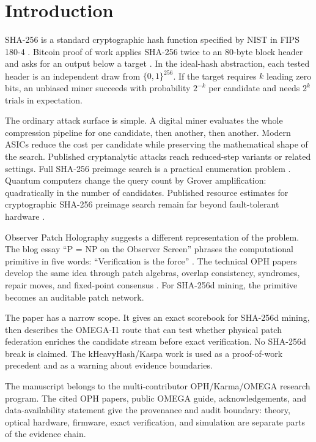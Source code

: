 \documentclass[11pt]{article}
\theoremstyle{definition}
\theoremstyle{remark}
\newcommand{\bits}{\{0,1\}}
\begin{document}
\section{Introduction}

SHA-256 is a standard cryptographic hash function specified by NIST in FIPS
180-4 \cite{NISTFIPS1804}. Bitcoin proof of work applies SHA-256 twice to an
80-byte block header and asks for an output below a target \cite{Nakamoto2008}.
In the ideal-hash abstraction, each tested header is an independent draw from
\(\bits^{256}\). If the target requires \(k\) leading zero bits, an unbiased
miner succeeds with probability \(2^{-k}\) per candidate and needs \(2^k\)
trials in expectation.

The ordinary attack surface is simple. A digital miner evaluates the whole
compression pipeline for one candidate, then another, then another. Modern
ASICs reduce the cost per candidate while preserving the mathematical shape of
the search. Published cryptanalytic attacks reach reduced-step variants or related
settings. Full SHA-256 preimage search is a practical enumeration problem
\cite{MendelNadSchlaeffer2013,KhovratovichRechbergerSavelieva2011,AlamgirNejatiBright2024}.
Quantum computers change the query count by Grover amplification: quadratically
in the number of candidates. Published resource estimates for
cryptographic SHA-256 preimage search remain far beyond fault-tolerant
hardware \cite{Grover1997,Zalka1999,AmyEtAl2016,NeremGaur2023}.

Observer Patch Holography suggests a different representation of the problem.
The blog essay ``P = NP on the Observer Screen'' phrases the computational
primitive in five words: ``Verification is the force'' \cite{OPHBlogPNP}. The
technical OPH papers develop the same idea through patch algebras, overlap
consistency, syndromes, repair moves, and fixed-point consensus
\cite{OPHObserversCurrent,OPHCompactCurrent,OPHConsensusCurrent,OPHScreenCurrent}. For SHA-256d mining, the
primitive becomes an auditable patch network.

The paper has a narrow scope. It gives an exact scorebook for SHA-256d mining,
then describes the OMEGA-I1 route that can test whether physical patch
federation enriches the candidate stream before exact verification. No SHA-256d
break is claimed. The kHeavyHash/Kaspa work is used as a proof-of-work
precedent and as a warning about evidence boundaries.

The manuscript belongs to the multi-contributor OPH/Karma/OMEGA research
program. The cited OPH papers, public OMEGA guide, acknowledgements, and
data-availability statement give the provenance and audit boundary: theory,
optical hardware, firmware, exact verification, and simulation are separate
parts of the evidence chain.
\end{document}
